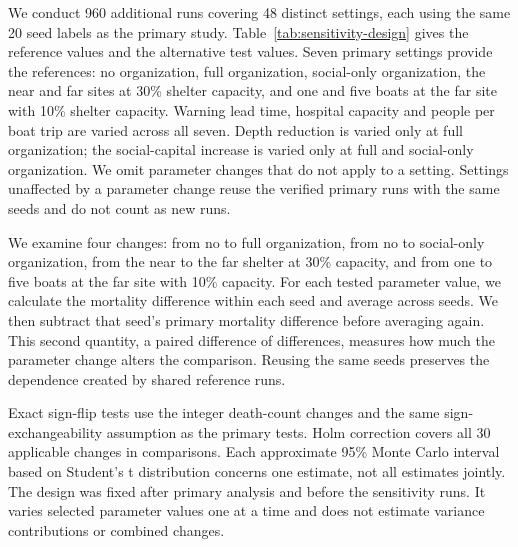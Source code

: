 We conduct 960 additional runs covering 48 distinct settings, each using the same 20 seed labels as the primary study. Table~\ref{tab:sensitivity-design} gives the reference values and the alternative test values. Seven primary settings provide the references: no organization, full organization, social-only organization, the near and far sites at 30\% shelter capacity, and one and five boats at the far site with 10\% shelter capacity. Warning lead time, hospital capacity and people per boat trip are varied across all seven. Depth reduction is varied only at full organization; the social-capital increase is varied only at full and social-only organization. We omit parameter changes that do not apply to a setting. Settings unaffected by a parameter change reuse the verified primary runs with the same seeds and do not count as new runs.

We examine four changes: from no to full organization, from no to social-only organization, from the near to the far shelter at 30\% capacity, and from one to five boats at the far site with 10\% capacity. For each tested parameter value, we calculate the mortality difference within each seed and average across seeds. We then subtract that seed's primary mortality difference before averaging again. This second quantity, a paired difference of differences, measures how much the parameter change alters the comparison. Reusing the same seeds preserves the dependence created by shared reference runs.

Exact sign-flip tests use the integer death-count changes and the same sign-exchangeability assumption as the primary tests. Holm correction covers all 30 applicable changes in comparisons. Each approximate 95\% Monte Carlo interval based on Student's t distribution concerns one estimate, not all estimates jointly. The design was fixed after primary analysis and before the sensitivity runs. It varies selected parameter values one at a time and does not estimate variance contributions or combined changes.
